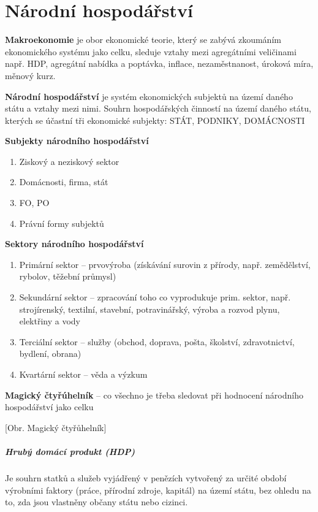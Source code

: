 \chapter{Národní hospodářství}

\textbf{Makroekonomie} je obor ekonomické teorie, který se zabývá zkoumáním ekonomického systému jako celku, sleduje vztahy mezi agregátními veličinami např. HDP, agregátní nabídka a poptávka, inflace, nezaměstnanost, úroková míra, měnový kurz.

\textbf{Národní hospodářství} je systém ekonomických subjektů na území daného státu a vztahy mezi nimi. Souhrn hospodářských činností na území daného státu, kterých se účastní tři ekonomické subjekty: STÁT, PODNIKY, DOMÁCNOSTI

\textbf{Subjekty národního hospodářství}
\begin{enumerate}
    \item Ziskový a neziskový sektor
    \item Domácnosti, firma, stát
    \item FO, PO
    \item Právní formy subjektů
\end{enumerate}

\textbf{Sektory národního hospodářství}
\begin{enumerate}
    \item Primární sektor -- prvovýroba (získávání surovin z přírody, např. zemědělství, rybolov, těžební průmysl)
    \item Sekundární sektor -- zpracování toho co vyprodukuje prim. sektor, např. strojírenský, textilní, stavební, potravinářský, výroba a rozvod plynu, elektřiny a vody
    \item Terciální sektor -- služby (obchod, doprava, pošta, školství, zdravotnictví, bydlení, obrana)
    \item Kvartární sektor -- věda a výzkum
\end{enumerate}

\textbf{Magický čtyřúhelník} -- co všechno je třeba sledovat při hodnocení národního hospodářství jako celku

[Obr. Magický čtyřůhelník]

\paragraph{Hrubý domácí produkt (HDP)}
Je souhrn statků a služeb vyjádřený v penězích vytvořený za určité období výrobními faktory
(práce, přírodní zdroje, kapitál) na území státu, bez ohledu na to, zda jsou vlastněny občany
státu nebo cizinci.

